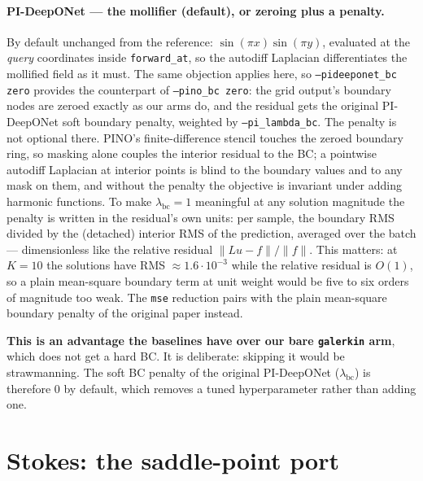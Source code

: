 \documentclass[11pt]{article}
\begin{document}
\paragraph{PI-DeepONet --- the mollifier (default), or zeroing plus a penalty.} By default
unchanged from the reference: $\sin(\pi x)\sin(\pi y)$, evaluated at the \emph{query}
coordinates inside \texttt{forward\_at}, so the autodiff Laplacian differentiates the mollified
field as it must. The same objection applies here, so \texttt{--pideeponet\_bc zero} provides the
counterpart of \texttt{--pino\_bc zero}: the grid output's boundary nodes are zeroed exactly as our
arms do, and the residual gets the original PI-DeepONet soft boundary penalty, weighted by
\texttt{--pi\_lambda\_bc}. The penalty is not optional there. PINO's finite-difference stencil
touches the zeroed boundary ring, so masking alone couples the interior residual to the BC; a
pointwise autodiff Laplacian at interior points is blind to the boundary values and to any mask on
them, and without the penalty the objective is invariant under adding harmonic functions. To make
$\lambda_{\mathrm{bc}}=1$ meaningful at any solution magnitude the penalty is written in the
residual's own units: per sample, the boundary RMS divided by the (detached) interior RMS of the
prediction, averaged over the batch --- dimensionless like the relative residual
$\|Lu-f\|/\|f\|$. This matters: at $K=10$ the solutions have RMS $\approx1.6\cdot10^{-3}$ while
the relative residual is $O(1)$, so a plain mean-square boundary term at unit weight would be five
to six orders of magnitude too weak. The \texttt{mse} reduction pairs with the plain mean-square boundary penalty of
the original paper instead.

\textbf{This is an advantage the baselines have over our bare \texttt{galerkin} arm}, which does not
get a hard BC. It is deliberate: skipping it would be strawmanning. The soft BC penalty of the
original PI-DeepONet ($\lambda_{\mathrm{bc}}$) is therefore $0$ by default, which removes a tuned
hyperparameter rather than adding one.

\section*{Stokes: the saddle-point port}
\end{document}
